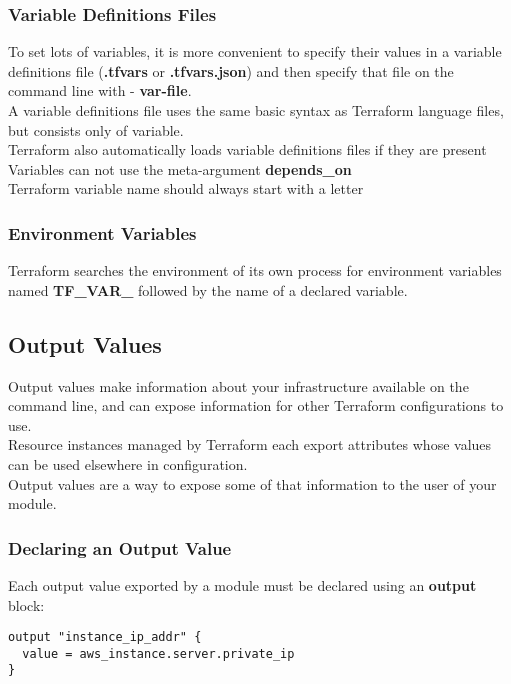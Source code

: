 \documentclass[12pt, letterpaper, twoside]{article}
\begin{document}
\subsubsection{Variable Definitions Files}
To set lots of variables, it is more convenient to specify their values in a variable definitions file 
(\textbf{.tfvars} or \textbf{.tfvars.json}) and then specify that file on the command line with -
\textbf{var-file}.\\
A variable definitions file uses the same basic syntax as Terraform language files, but consists only 
of variable.\\
Terraform also automatically loads  variable definitions files if they are present\\

Variables can not use the meta-argument	\textbf{depends\_on}\\

Terraform variable name should always start with a letter

\subsubsection{Environment Variables}
 Terraform searches the environment of its own process for environment variables named \textbf{TF\_VAR\_} 
 followed by the name of a declared variable.

\subsection{Output Values}
Output values make information about your infrastructure available on the command line, and can 
expose information for other Terraform configurations to use.\\
Resource instances managed by Terraform each export attributes whose values can be used elsewhere in configuration.\\
Output values are a way to expose some of that information to the user of your module.\\

\subsubsection{Declaring an Output Value}
Each output value exported by a module must be declared using an \textbf{output} block:
\begin{verbatim}
output "instance_ip_addr" {
  value = aws_instance.server.private_ip
}
\end{verbatim}
\end{document}

